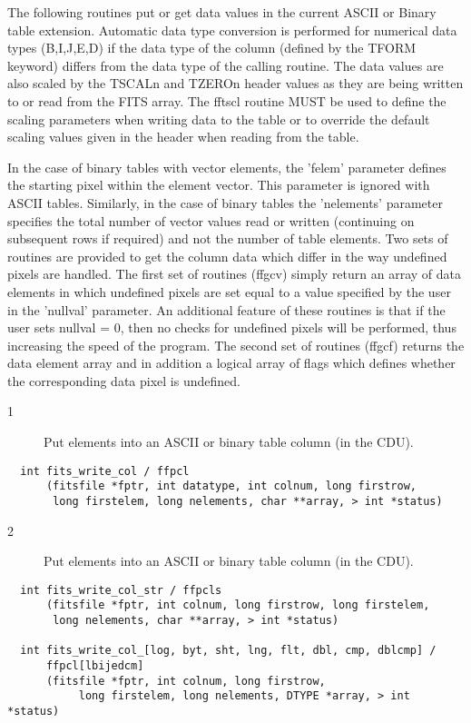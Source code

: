 The following routines put or get data values in the current ASCII or
Binary table extension.  Automatic data type conversion is performed
for numerical data types (B,I,J,E,D) if the data type of the column
(defined by the TFORM keyword) differs from the data type of the
calling routine.  The data values are also scaled by the TSCALn and
TZEROn header values as they are being written to or read from the FITS
array.  The fftscl routine MUST be used to define the scaling
parameters when writing data to the table or to override the default
scaling values given in the header when reading from the table.

    In the case of binary tables with vector elements, the 'felem'
parameter defines the starting pixel within the element vector.  This
parameter is ignored with ASCII tables. Similarly, in the case of
binary tables the 'nelements' parameter specifies the total number of
vector values read or written (continuing on subsequent rows if
required) and not the number of table elements.  Two sets of
routines are provided to get the column data which differ in the way
undefined pixels are handled.  The first set of routines (ffgcv)
simply return an array of data elements in which undefined pixels are
set equal to a value specified by the user in the 'nullval' parameter.
An additional feature of these routines is that if the user sets
nullval = 0, then no checks for undefined pixels will be performed,
thus increasing the speed of the program.  The second set of routines
(ffgcf) returns the data element array and in addition a logical array
of flags which defines whether the corresponding data pixel is undefined.


\begin{description}
\item[1 ] Put elements into an ASCII or binary table column (in the CDU).
\end{description}

\begin{verbatim}
  int fits_write_col / ffpcl
      (fitsfile *fptr, int datatype, int colnum, long firstrow,
       long firstelem, long nelements, char **array, > int *status)
\end{verbatim}

\begin{description}
\item[2 ] Put elements into an ASCII or binary table column (in the CDU).
\end{description}

\begin{verbatim}
  int fits_write_col_str / ffpcls
      (fitsfile *fptr, int colnum, long firstrow, long firstelem,
       long nelements, char **array, > int *status)

  int fits_write_col_[log, byt, sht, lng, flt, dbl, cmp, dblcmp] /
      ffpcl[lbijedcm]
      (fitsfile *fptr, int colnum, long firstrow,
           long firstelem, long nelements, DTYPE *array, > int *status)
\end{verbatim}

